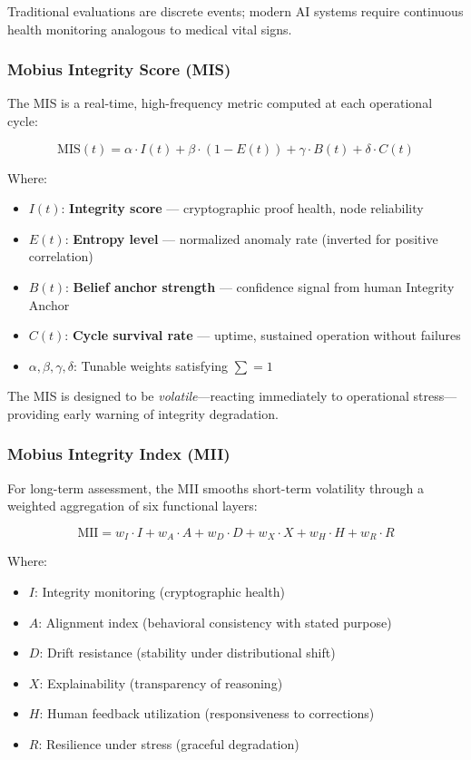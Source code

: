 \documentclass[11pt,letterpaper]{article}
\begin{document}
Traditional evaluations are discrete events; modern AI systems require continuous health monitoring analogous to medical vital signs.

\subsubsection{Mobius Integrity Score (MIS)}

The MIS is a real-time, high-frequency metric computed at each operational cycle:

\begin{equation}
\text{MIS}(t) = \alpha \cdot I(t) + \beta \cdot (1 - E(t)) + \gamma \cdot B(t) + \delta \cdot C(t)
\label{eq:mis}
\end{equation}

Where:
\begin{itemize}
    \item $I(t)$: \textbf{Integrity score} — cryptographic proof health, node reliability
    \item $E(t)$: \textbf{Entropy level} — normalized anomaly rate (inverted for positive correlation)
    \item $B(t)$: \textbf{Belief anchor strength} — confidence signal from human Integrity Anchor
    \item $C(t)$: \textbf{Cycle survival rate} — uptime, sustained operation without failures
    \item $\alpha, \beta, \gamma, \delta$: Tunable weights satisfying $\sum = 1$
\end{itemize}

The MIS is designed to be \textit{volatile}—reacting immediately to operational stress—providing early warning of integrity degradation.

\subsubsection{Mobius Integrity Index (MII)}

For long-term assessment, the MII smooths short-term volatility through a weighted aggregation of six functional layers:

\begin{equation}
\text{MII} = w_I \cdot I + w_A \cdot A + w_D \cdot D + w_X \cdot X + w_H \cdot H + w_R \cdot R
\label{eq:mii}
\end{equation}

Where:
\begin{itemize}
    \item $I$: Integrity monitoring (cryptographic health)
    \item $A$: Alignment index (behavioral consistency with stated purpose)
    \item $D$: Drift resistance (stability under distributional shift)
    \item $X$: Explainability (transparency of reasoning)
    \item $H$: Human feedback utilization (responsiveness to corrections)
    \item $R$: Resilience under stress (graceful degradation)
\end{itemize}
\end{document}
